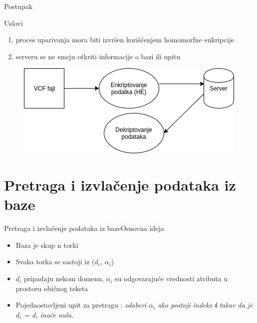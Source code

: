 \documentclass[10pt]{beamer}
\begin{document}
\begin{frame}{Postupak}
\begin{block}{Uslovi}
	\begin{enumerate}
		\item proces uparivanja mora biti izvršen korišćenjem homomorfne enkripcije
		\item serveru se ne smeju otkriti informacije o bazi ili upitu
	\end{enumerate}			
\end{block}
\begin{figure}[H]
 	\centering
	\includegraphics[width=\textwidth,height=\textheight,keepaspectratio]{slika3.png}
 	\label{fig:primer}
 \end{figure}
\end{frame}



\section{Pretraga i izvlačenje podataka iz baze}
\begin{frame}{Pretraga i izvlačenje podataka iz baze}{Osnovna ideja}
\begin{block}{}
\begin{itemize}
\item Baza je skup n torki
\item Svaka torka se sastoji iz ($d_i$, $\alpha_i$)
\item $d_i$ pripadaju nekom domenu, $\alpha_i$ su odgovarajuće vrednosti atributa u prostoru običnog teksta 
\item Pojednostavljeni upit za pretragu : \textit{odaberi $\alpha_i$ ako postoji indeks \textbf{i} takav da je $d_i$ = d, inače nula.}
\end{itemize}
\end{block}

\end{frame}
     
\end{document}
